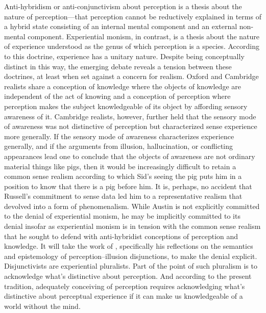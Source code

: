 Anti-hybridism or anti-conjunctivism about perception is a thesis about the nature of perception---that perception cannot be reductively explained in terms of a hybrid state consisting of an internal mental component and an external non-mental component. Experiential monism, in contrast, is a thesis about the nature of experience understood as the genus of which perception is a species. According to this doctrine, experience has a unitary nature. Despite being conceptually distinct in this way, the emerging debate reveals a tension between these doctrines, at least when set against a concern for realism. Oxford and Cambridge realists share a conception of knowledge where the objects of knowledge are independent of the act of knowing and a conception of perception where perception makes the subject knowledgeable of its object by affording sensory awareness of it. Cambridge realists, however, further held that the sensory mode of awareness was not distinctive of perception but characterized sense experience more generally. If the sensory mode of awareness characterizes experience generally, and if the arguments from illusion, hallucination, or conflicting appearances lead one to conclude that the objects of awareness are not ordinary material things like pigs, then it would be increasingly difficult to retain a common sense realism according to which Sid's seeing the pig puts him in a position to know that there is a pig before him. It is, perhaps, no accident that Russell's commitment to sense data led him to a representative realism that devolved into a form of phenomenalism. While Austin is not explicitly committed to the denial of experiential monism, he may be implicitly committed to its denial insofar as experiential monism is in tension with the common sense realism that he sought to defend with anti-hybridist conceptions of perception and knowledge. It will take the work of \citet{Hinton:1973js}, specifically his reflections on the semantics and epistemology of perception--illusion disjunctions, to make the denial explicit. Disjunctivists are experiential pluralists. Part of the point of such pluralism is to acknowledge what's distinctive about perception. And according to the present tradition, adequately conceiving of perception requires acknowledging what's distinctive about perceptual experience if it can make us knowledgeable of a world without the mind.


